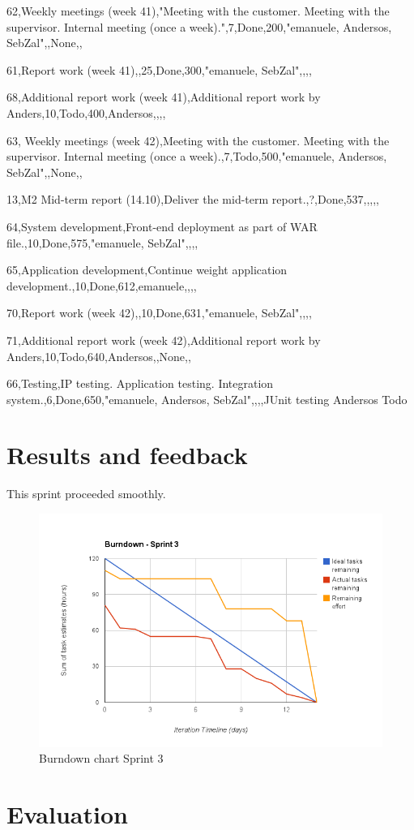 62,Weekly meetings (week 41),"Meeting with the customer.
Meeting with the supervisor.
Internal meeting (once a week).",7,Done,200,"emanuele, Andersos, SebZal",,None,,

61,Report work (week 41),,25,Done,300,"emanuele, SebZal",,,,

68,Additional report work (week 41),Additional report work by Anders,10,Todo,400,Andersos,,,,

63, Weekly meetings (week 42),Meeting with the customer. Meeting with the supervisor. Internal meeting (once a week).,7,Todo,500,"emanuele, Andersos, SebZal",,None,,

13,M2 Mid-term report (14.10),Deliver the mid-term report.,?,Done,537,,,,,

64,System development,Front-end deployment as part of WAR file.,10,Done,575,"emanuele, SebZal",,,,

65,Application development,Continue weight application development.,10,Done,612,emanuele,,,,

70,Report work (week 42),,10,Done,631,"emanuele, SebZal",,,,

71,Additional report work (week 42),Additional report work by Anders,10,Todo,640,Andersos,,None,,

66,Testing,IP testing. Application testing. Integration system.,6,Done,650,"emanuele, Andersos, SebZal",,,,JUnit testing	Andersos	Todo



\section{Results and feedback}

This sprint proceeded smoothly.


\begin{figure}[H]
\centering
\includegraphics[scale=0.60]{../Figures/burndownSprint3.png}
\caption{Burndown chart Sprint 3}
\label{figure:burndownsprint3}
\end{figure}



\section{Evaluation}

